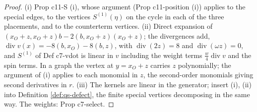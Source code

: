 \begin{proof}
(i) Prop c11-S (i), whose argument (Prop c11-position (i)) applies to the special edges, to the vertices $S^{(1)}(\eta)$ on the cycle in each of the three placements, and to the counterterm vertices. (ii) Direct expansion of $(x_O+z,x_O+z)b-2(b,x_O+z)(x_O+z)$; the divergences add, $\operatorname{div}v(x)=-8(b,x_O)-8(b,z)$, with $\operatorname{div}(2z)=8$ and $\operatorname{div}(\omega z)=0$, and $S^{(1)}$ of Def c7-vdot is linear in $v$ including the weight terms $\tfrac w4\operatorname{div}v$ and the spin terms. In a graph the vertex at $y=x_O+z$ carries $z$ polynomially; the argument of (i) applies to each monomial in $z$, the second-order monomials giving second derivatives in $r$. (iii) The kernels are linear in the generator; insert (i), (ii) into Definition \ref{def:qs-defect}, the finite special vertices decomposing in the same way. The weights: Prop c7-select.
\end{proof}
